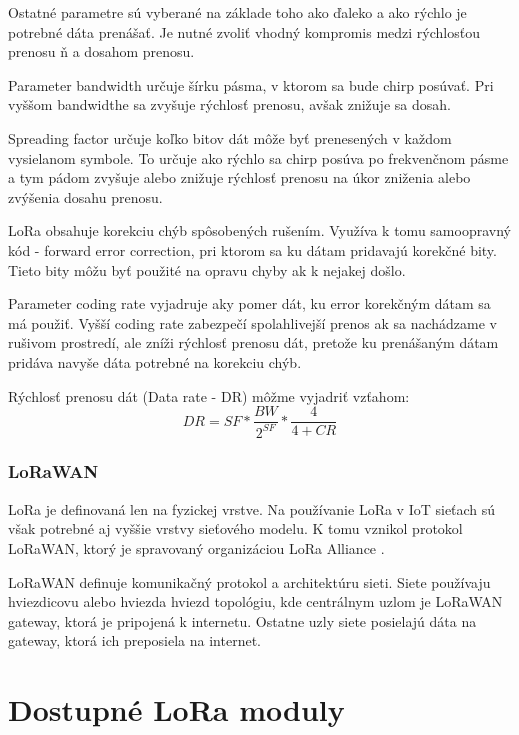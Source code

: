 \documentclass[slovak,master]{diploma}
\begin{document}
Ostatné parametre sú vyberané na základe toho ako ďaleko a ako rýchlo je potrebné dáta prenášať. Je nutné zvoliť vhodný kompromis medzi rýchlosťou prenosu ň
a dosahom prenosu.

Parameter bandwidth určuje šírku pásma, v ktorom sa bude chirp posúvať. Pri vyššom bandwidthe sa zvyšuje rýchlosť prenosu, avšak znižuje sa dosah.

Spreading factor určuje koľko bitov dát môže byť prenesených v každom vysielanom symbole. To určuje ako rýchlo sa chirp posúva po frekvenčnom pásme a tym pádom 
zvyšuje alebo znižuje rýchlosť prenosu na úkor zniženia alebo zvýšenia dosahu prenosu.

LoRa obsahuje korekciu chýb spôsobených rušením. Využíva k tomu samoopravný kód - forward error correction, pri ktorom 
sa ku dátam pridavajú korekčné bity. Tieto bity môžu byť použité na opravu chyby ak k nejakej došlo.

Parameter coding rate vyjadruje aky pomer dát, ku error korekčným dátam sa má použiť. Vyšší coding rate zabezpečí spolahlivejší prenos ak 
sa nachádzame v rušivom prostredí, ale zníži rýchlosť prenosu dát, pretože ku prenášaným dátam pridáva navyše dáta potrebné na korekciu chýb.

Rýchlosť prenosu dát (Data rate - DR) môžme vyjadriť vzťahom:
\begin{equation}
  DR = SF * \frac{BW}{2^{SF}} * \frac{4}{4+CR}
\end{equation}

\subsection{LoRaWAN}
LoRa je definovaná len na fyzickej vrstve. Na používanie LoRa v IoT sieťach sú však potrebné aj vyššie vrstvy sieťového modelu.
K tomu vznikol protokol LoRaWAN, ktorý je spravovaný organizáciou LoRa Alliance \cite{lora}.

LoRaWAN definuje komunikačný protokol a architektúru sieti. Siete používaju hviezdicovu alebo hviezda hviezd topológiu, kde 
centrálnym uzlom je LoRaWAN gateway, ktorá je pripojená k internetu. Ostatne uzly siete posielajú dáta na gateway, ktorá ich preposiela na internet.

\chapter{Dostupné LoRa moduly }
\end{document}
